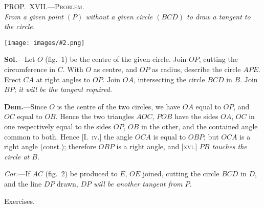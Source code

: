 \documentclass[oneside]{book}
\newcommand\myprop[2]{
\bigskip\Needspace*{4\baselineskip}\begin{center}\textsc{#1}\\\medskip\emph{#2}\par\end{center}
}
\newcommand\exhead[1]{
\Needspace*{5\baselineskip}\begin{center}
\textsf{#1}
\end{center}
}
\newcommand\imgcent[2]{
\begin{center}
\texttt{[image: images/\#2.png]}
\end{center}
}
\begin{document}
\myprop{PROP\@.~XVII\@.---Problem.}{From a given point $(P)$ without a given circle $(BCD)$ to
draw a tangent to the circle.}

\imgcent{295}{f123}

\textbf{Sol.}---Let $O$ (fig.~1) be the centre of the given circle.
Join $OP$, cutting the circumference in $C$. With $O$ as
centre, and $OP$ as radius, describe the circle $APE$.
Erect $CA$ at right angles to $OP$. Join $OA$, intersecting
the circle $BCD$ in $B$. Join $BP$; \emph{it will be the
tangent required.}

\textbf{Dem.}---Since $O$ is the centre of the two circles,
we have $OA$ equal to $OP$, and $OC$ equal to $OB$.
Hence the two triangles $AOC$, $POB$ have the sides
$OA$, $OC$ in one respectively equal to the sides $OP$, $OB$
in the other, and the contained angle common to both.
Hence [I.~\textsc{iv.}] the angle $OCA$ is equal to $OBP$; but
$OCA$ is a right angle (const.); therefore $OBP$ is a
right angle, and [\textsc{xvi.}] \emph{$PB$ touches the circle at $B$.}

\emph{Cor.}---If $AC$ (fig.~2) be produced to $E$, $OE$ joined,
cutting the circle $BCD$ in $D$, and the line $DP$ drawn,
\emph{$DP$ will be another tangent from $P$.}

\exhead{Exercises.}
\end{document}
